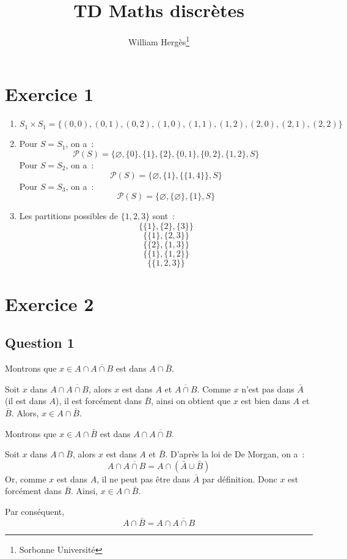 \documentclass[a4paper]{article}
\title{TD Maths discrètes}
\author{William Hergès\thanks{Sorbonne Université}}
\begin{document}
	\maketitle
    \section*{Exercice 1}
    \begin{enumerate}
        \item $S_1\times S_1 = \{(0,0),(0,1),(0,2),(1,0),(1,1),(1,2),(2,0),(2,1),(2,2)\}$
        \item Pour $S=S_1$, on a~:
            $$ \mathcal{P}(S) = \{\varnothing, \{0\}, \{1\}, \{2\}, \{0,1\},\{0,2\},\{1,2\},S\} $$
            Pour $S=S_2$, on a~:
            $$ \mathcal{P}(S) = \{\varnothing, \{1\}, \{\{1,4\}\}, S\} $$
            Pour $S=S_3$, on a~:
            $$ \mathcal{P}(S) = \{\varnothing, \{\varnothing\},\{1\}, S\} $$
        \item Les partitions possibles de $\{1,2,3\}$ sont~:
            $$ \{\{1\},\{2\},\{3\}\} $$
            $$ \{\{1\},\{2, 3\}\} $$
            $$ \{\{2\},\{1, 3\}\} $$
            $$ \{\{1\},\{1, 2\}\} $$
            $$ \{\{1, 2, 3\}\} $$
    \end{enumerate}
    \section*{Exercice 2}
    \subsection*{Question 1}
    Montrons que $x\in A\cap\overline{A \cap B}$ est dans $A\cap\bar B$.

    Soit $x$ dans $A\cap\overline{A\cap B}$, alors $x$ est dans $A$ et $\overline{A\cap B}$. 
    Comme $x$ n'est pas dans $\bar A$ (il est dans $A$), il est forcément dans $\bar B$, ainsi on obtient que $x$
    est bien dans $A$ et $\bar B$.
    Alors, $x\in A\cap\bar B$.

    Montrons que $x\in A\cap\bar B$ est dans $A\cap\overline{A\cap B}$.

    Soit $x$ dans $A\cap\bar B$, alors $x$ est dans $A$ et $\bar B$.
    D'après la loi de De Morgan, on a~:
    $$ A\cap\overline{A\cap B} = A\cap(\bar A\cup \bar B) $$
    Or, comme $x$ est dans $A$, il ne peut pas être dans $\bar A$ par définition. 
    Donc $x$ est forcément dans $\bar B$.
    Ainsi, $x\in A\cap\bar B$.

    Par conséquent, $$A\cap\bar B = A\cap\overline{A\cap B}$$
\end{document}
